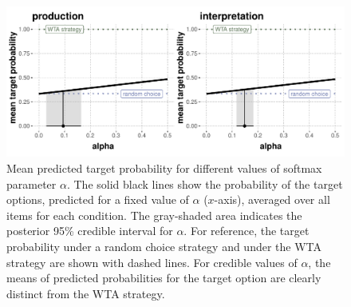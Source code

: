 \documentclass[fleqn]{article}
\begin{document}
\begin{figure}[t]
  \centering
  \includegraphics[width=\textwidth]{00-pics/closeness-target-by-alpha-item-level.pdf}
  \caption{
    Mean predicted target probability for different values of softmax parameter $\alpha$.
    The solid black lines show the probability of the target options, predicted for a fixed value of $\alpha$ ($x$-axis), averaged over all items for each condition.
    The gray-shaded area indicates the posterior 95\% credible interval for $\alpha$.
    For reference, the target probability under a random choice strategy and under the WTA strategy are shown with dashed lines.
    For credible values of $\alpha$, the means of predicted probabilities for the target option are clearly distinct from the WTA strategy.
  }
  \label{fig:closeness-target-item-level}
\end{figure}
\end{document}
